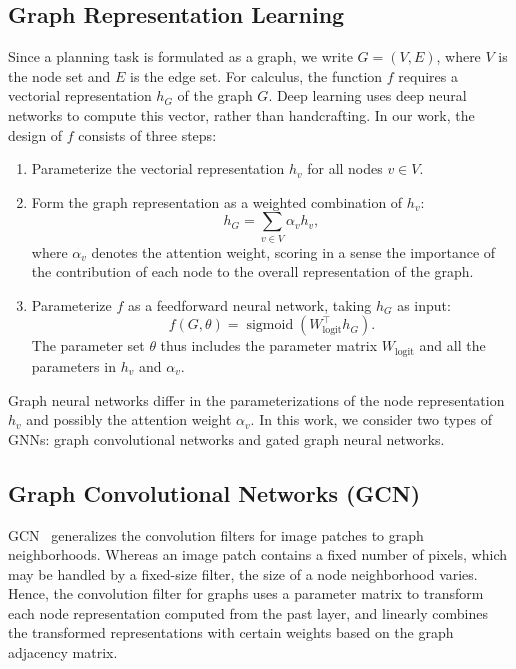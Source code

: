 \documentclass[letterpaper]{article} %
\DeclareMathOperator{\sigmoid}{sigmoid}
\begin{document}
\subsection{Graph Representation Learning}
Since a planning task is formulated as a graph, we write $G=(V,E)$, where $V$ is the node set and $E$ is the edge set. For calculus, the function $f$ requires a vectorial representation $h_G$ of the graph $G$. Deep learning uses deep neural networks to compute this vector, rather than handcrafting. In our work, the design of $f$ consists of three steps:
\begin{enumerate}
\item Parameterize the vectorial representation $h_v$ for all nodes $v\in V$.

\item Form the graph representation as a weighted combination of $h_v$:
\begin{equation}\label{eqn:hG}
h_G=\sum_{v\in V}\alpha_vh_v,
\end{equation}
where $\alpha_v$ denotes the attention weight, scoring in a sense the importance of the contribution of each node to the overall representation of the graph.

\item Parameterize $f$ as a feedforward neural network, taking $h_G$ as input:
\begin{equation}\label{eqn:f}
f(G,\theta)=\sigmoid(W_{\text{logit}}^{\top}h_G).
\end{equation}
The parameter set $\theta$ thus includes the parameter matrix $W_{\text{logit}}$ and all the parameters in $h_v$ and $\alpha_v$.
\end{enumerate}

Graph neural networks differ in the parameterizations of the node representation $h_v$ and possibly the attention weight $\alpha_v$. In this work, we consider two types of GNNs: graph convolutional networks and gated graph neural networks.


\subsection{Graph Convolutional Networks (GCN)}
GCN~\cite{Kipf2017} generalizes the convolution filters for image patches to graph neighborhoods. Whereas an image patch contains a fixed number of pixels, which may be handled by a fixed-size filter, the size of a node neighborhood varies. Hence, the convolution filter for graphs uses a parameter matrix to transform each node representation computed from the past layer, and linearly combines the transformed representations with certain weights based on the graph adjacency matrix.
\end{document}
